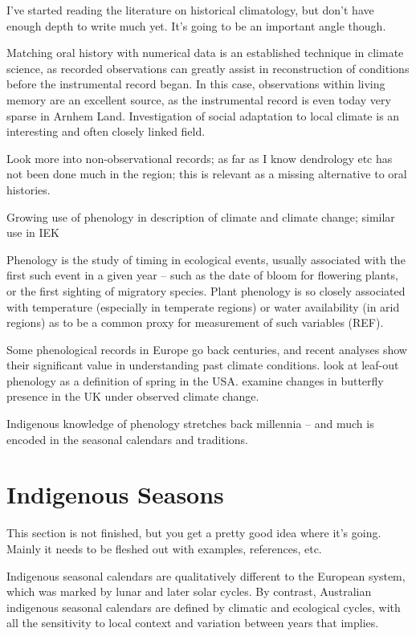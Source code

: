 I've started reading the literature on historical climatology, but don't have 
enough depth to write much yet.  It's going to be an important angle though. 

Matching oral history with numerical data is an established technique in 
climate science, as recorded observations can greatly assist in reconstruction 
of conditions before the instrumental record began.  In this case, observations 
within living memory are an excellent source, as the instrumental record is 
even today very sparse in Arnhem Land.  Investigation of social adaptation to 
local climate is an interesting and often closely linked field.

Look more into non-observational records; as far as I know dendrology etc has 
not been done much in the region; this is relevant as a missing alternative to 
oral histories.

Growing use of phenology in description of climate and climate change; similar 
use in IEK

Phenology is the study of timing in ecological events, usually associated with 
the first such event in a given year – such as the date of bloom for flowering 
plants, or the first sighting of migratory species.  Plant phenology is so 
closely associated with temperature (especially in temperate regions) or water 
availability (in arid regions) as to be a common proxy for measurement of such 
variables (REF).

Some phenological records in Europe go back centuries, and recent analyses show 
their significant value in understanding past climate conditions.
\citet{allstadt2015} look at leaf-out phenology as a definition of spring 
in the USA.  \citet{menzel2006} examine changes in butterfly presence in the
UK under observed climate change.

Indigenous knowledge of phenology stretches back millennia – and much is 
encoded in the seasonal calendars and traditions.


\section{Indigenous Seasons}
This section is not finished, but you get a pretty good idea where it's 
going.  Mainly it needs to be fleshed out with examples, references, etc. 

Indigenous seasonal calendars are qualitatively different to the European 
system, which was marked by lunar and later solar cycles.  By contrast, 
Australian indigenous seasonal calendars are defined by climatic and ecological 
cycles, with all the sensitivity to local context and variation between years 
that implies.

